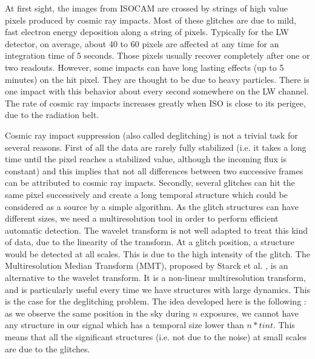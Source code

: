 At first sight, the images from ISOCAM are crossed by strings of high
value pixels produced by cosmic ray impacts. Most of these glitches are 
due to mild, fast electron energy deposition along a string of pixels.  
Typically for the LW
detector, on average, about 40 to 60 pixels are affected at any time
for an integration time of 5 seconds. Those pixels usually recover
completely after one or two readouts. However, some impacts can have
long lasting effects (up to 5 minutes) on the hit pixel. They are
thought to be due to heavy particles. There is one impact with this
behavior about every second somewhere on the LW channel.  The rate of
cosmic ray impacts increases greatly when ISO is close to its
perigee, due to the radiation belt.

Cosmic ray impact suppression (also called deglitching) is not a
trivial task for several reasons. First of all the data are rarely
fully stabilized (i.e. it takes a long time until the pixel reaches a
stabilized value, although the incoming flux is constant) and this
implies that not all differences between two successive frames can be
attributed to cosmic ray impacts. Secondly, several glitches can hit
 the same pixel successively and create a long temporal structure which
could be considered as a source by a simple algorithm. 
As the glitch structures can have different sizes, we need a
multiresolution tool in order to perform   efficient automatic
detection. The wavelet
transform is not well adapted to treat this kind of data, due to the
linearity of the transform. At a glitch position, a structure would be
detected at all scales. This is due to the high intensity of the
glitch. The Multiresolution Median Transform (MMT), proposed by Starck
et al. \cite{starck:book98}, is an alternative to the wavelet transform. It is a
non-linear multiresolution transform, and is particularly useful every
time we have structures with large dynamics. This is the case for the
deglitching problem. The idea developed here is the 
following \cite{starck:sta99_1}: 
as we observe  the same position in the sky during $n$ exposures, we cannot have any structure in our signal 
which has a temporal size lower than $n*tint$. This means that all the 
significant structures (i.e. not due to the noise) at small scales
are due to the glitches.  

